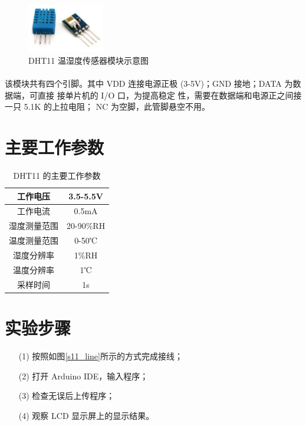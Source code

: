 \documentclass[UTF8, oneside]{ctexbook}
\begin{document}
\begin{figure}[h]
    \centering
    \includegraphics[width=0.3\textwidth]{./result/sensor/11/sensor.png}
    \caption{DHT11 温湿度传感器模块示意图}
    \label{11_sensor}
\end{figure}

\paragraph{}
该模块共有四个引脚。其中 VDD 连接电源正极 (3-5V)；GND 接地；DATA 为数据端，可直接
接单片机的 I/O 口，为提高稳定 性，需要在数据端和电源正之间接一只 5.1K 的上拉电阻；
NC 为空脚，此管脚悬空不用。

\section{主要工作参数}
\newpage
\begin{table}[h]
    \centering
    \begin{tabular}{|c|c|}
    \hline
    工作电压   & 3.5-5.5V  \\ \hline
    工作电流   & 0.5mA     \\ \hline
    湿度测量范围 & 20-90\%RH \\ \hline
    温度测量范围 & 0-50℃     \\ \hline
    湿度分辨率  & 1\%RH     \\ \hline
    温度分辨率  & 1℃        \\ \hline
    采样时间   & 1s        \\ \hline
    \end{tabular}
    \caption{DHT11 的主要工作参数}
    \label{dht11}
\end{table}

\section{实验步骤}
\begin{itemize}
    \item[(1)] 按照如图\ref{s11_line}所示的方式完成接线；
    \item[(2)] 打开 Arduino IDE，输入程序；
    \item[(3)] 检查无误后上传程序；
    \item[(4)] 观察 LCD 显示屏上的显示结果。
\end{itemize}
\end{document}
